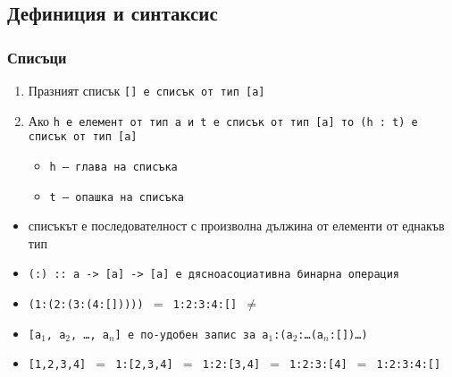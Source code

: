 \documentclass{beamer}
\begin{document}
\subsection{Дефиниция и синтаксис}


\begin{frame}
  \frametitle{Списъци}

  \begin{definition}
    \begin{enumerate}
    \item Празният списък \tt{[]} е списък от тип \tt{[a]}
    \item Ако \tt h е елемент от тип \tt a и \tt t е списък от тип \tt{[a]} то \tt{(h : t)} е списък от тип \tt{[a]}
      \begin{itemize}
      \item \tt h --- глава на списъка
      \item \tt t --- опашка на списъка
      \end{itemize}
    \end{enumerate}
  \end{definition}
  \onslide<+->
  \begin{itemize}[<+->]
  \item списъкът е последователност с \alert{произволна дължина} от елементи от \alert{еднакъв тип}
  \item \tt{(:) :: a -> [a] -> [a]}  е \alert{дясноасоциативна} бинарна операция
  \item \tt{(1:(2:(3:(4:[]))))} $=$ \tt{1:2:3:4:[]} $\neq$ 
  \item \tt{[a$_1$, a$_2$, \ldots, a$_n$]} e по-удобен запис за \tt{a$_1$:(a$_2$:\ldots(a$_n$:[])\ldots)}
  \item \tt{[1,2,3,4]} $=$ \tt{1:[2,3,4]} $=$ \tt{1:2:[3,4]} $=$ \tt{1:2:3:[4]} $=$ \tt{1:2:3:4:[]}\
  \end{itemize}
\end{frame}
\end{document}
